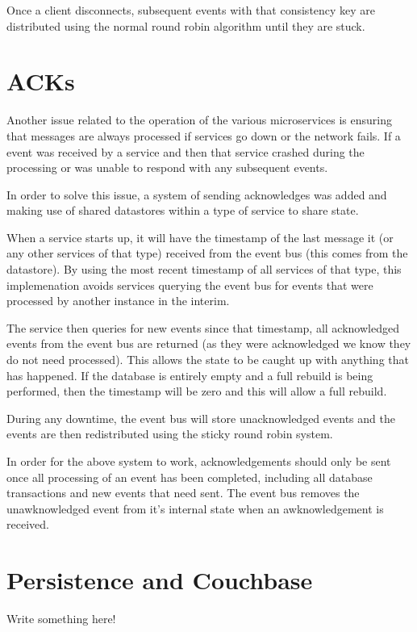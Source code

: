 \documentclass{l3proj}
\begin{document}
Once a client disconnects, subsequent events with that consistency key are distributed using the normal round robin algorithm until they are stuck.

\section{ACKs}
\label{sec:acks}

Another issue related to the operation of the various microservices is ensuring that messages are always processed if services go down or the network fails. If a event was received by a service and then that service crashed during the processing or was unable to respond with any subsequent events.

In order to solve this issue, a system of sending acknowledges was added and making use of shared datastores within a type of service to share state.

When a service starts up, it will have the timestamp of the last message it (or any other services of that type) received from the event bus (this comes from the datastore). By using the most recent timestamp of all services of that type, this implemenation avoids services querying the event bus for events that were processed by another instance in the interim.

The service then queries for new events since that timestamp, all acknowledged events from the event bus are returned (as they were acknowledged we know they do not need processed). This allows the state to be caught up with anything that has happened. If the database is entirely empty and a full rebuild is being performed, then the timestamp will be zero and this will allow a full rebuild.

During any downtime, the event bus will store unacknowledged events and the events are then redistributed using the sticky round robin system.

In order for the above system to work, acknowledgements should only be sent once all processing of an event has been completed, including all database transactions and new events that need sent. The event bus removes the unawknowledged event from it's internal state when an awknowledgement is received.

\section{Persistence and Couchbase}
\label{sec:persistence}
Write something here!
\end{document}
